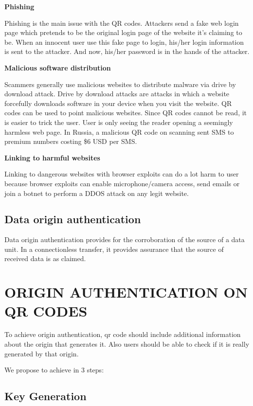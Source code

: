 \documentclass[12pt,journal,compsoc]{IEEEtran}
\begin{document}
\textbf{Phishing}


Phishing is the main issue with the QR codes. Attackers send a fake web login page which pretends to be the original login page of the website it’s claiming to be. When an innocent user use this fake page to login, his/her login information is sent to the attacker. And now, his/her password is in the hands of the attacker.



\textbf{Malicious software distribution}

Scammers generally use malicious websites to distribute malware via drive by download attack. Drive by download attacks are attacks in which a website forcefully downloads software in your device when you visit the website. QR codes can be used to point malicious websites. Since QR codes cannot be read, it is easier to trick the user. User is only seeing the reader opening a seemingly harmless web page. In Russia, a malicious QR code on scanning sent SMS to premium numbers costing \$6 USD per SMS.

\textbf{Linking to harmful websites}

Linking to dangerous websites with browser exploits can do a lot harm to user because browser exploits can enable microphone/camera access, send emails or join a botnet to perform a DDOS attack on any legit website.

\subsection{Data origin authentication}

Data origin authentication provides for the corroboration of the source
of a data unit. In a connectionless transfer, it provides assurance that
the source of received data is as claimed.


\section{ORIGIN AUTHENTICATION ON QR CODES}

To achieve origin authentication, qr code should include additional information about the origin that generates it. Also users should be able to check if it is really generated by that origin.

We propose to achieve in 3 steps: 


\subsection{Key Generation}
\end{document}
